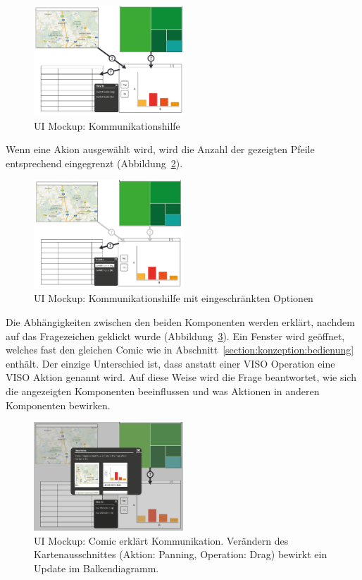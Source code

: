 \documentclass[
	headsepline,
	footsepline,
	fontsize=12pt,
	bibliography=totoc
]{scrbook}
\begin{document}
\begin{figure}[htbp]
   \centering
   \includegraphics[width=0.5\textwidth]{images/konzeption-kommunikation-step1.png}
   \caption{UI Mockup: Kommunikationshilfe}
   \label{figure:kommunikation-step1}
\end{figure}

Wenn eine Akion ausgewählt wird, wird die Anzahl der gezeigten Pfeile entsprechend eingegrenzt (Abbildung~\ref{figure:kommunikation-step2}).

\begin{figure}[htbp]
   \centering
   \includegraphics[width=0.5\textwidth]{images/konzeption-kommunikation-step2.png}
   \caption{UI Mockup: Kommunikationshilfe mit eingeschränkten Optionen}
   \label{figure:kommunikation-step2}
\end{figure}

Die Abhängigkeiten zwischen den beiden Komponenten werden erklärt, nachdem auf das Fragezeichen geklickt wurde (Abbildung~\ref{figure:kommunikation-step3}). Ein Fenster wird geöffnet, welches fast den gleichen Comic wie in Abschnitt~\ref{section:konzeption:bedienung} enthält. Der einzige Unterschied ist, dass anstatt einer VISO Operation eine VISO Aktion genannt wird. Auf diese Weise wird die Frage beantwortet, wie sich die angezeigten Komponenten beeinflussen und was Aktionen in anderen Komponenten bewirken.

\begin{figure}[htbp]
   \centering
   \includegraphics[width=0.5\textwidth]{images/konzeption-kommunikation-step3.png}
   \caption{UI Mockup: Comic erklärt Kommunikation. Verändern des Kartenausschnittes (Aktion: Panning, Operation: Drag) bewirkt ein Update im Balkendiagramm.}
   \label{figure:kommunikation-step3}
\end{figure}
\end{document}
